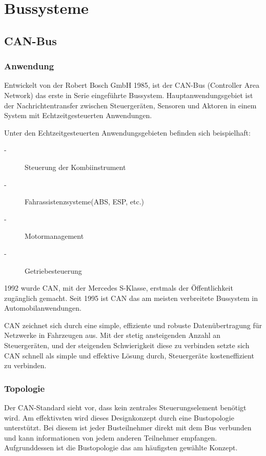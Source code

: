 

\section{Bussysteme}

\subsection{CAN-Bus}
    \subsubsection{Anwendung}
    Entwickelt von der Robert Bosch GmbH 1985, ist der CAN-Bus (Controller Area Network) 
    das erste in Serie eingeführte Bussystem. Hauptanwendungsgebiet ist der
    Nachrichtentransfer zwischen Steuergeräten, Sensoren und Aktoren in 
    einem System mit Echtzeitgesteuerten Anwendungen.~\cite{LA_CAN1}

    Unter den Echtzeitgesteuerten Anwendungsgebieten befinden sich beispielhaft:
    \begin{description}
    \item[-] Steuerung der Kombiinstrument
    \item[-] Fahrassistenzsysteme(ABS, ESP, etc.)
    \item[-] Motormanagement
    \item[-] Getriebesteuerung
    \end{description}
    1992 wurde CAN, mit der Mercedes S-Klasse, erstmals der Öffentlichkeit zugänglich gemacht. 
    Seit 1995 ist CAN das am meisten verbreitete Bussystem in Automobilanwendungen.
 
    CAN zeichnet sich durch eine simple, effiziente und robuste Datenübertragung für Netzwerke in 
    Fahrzeugen aus. Mit der stetig ansteigenden Anzahl an Steuergeräten, und der steigenden 
    Schwierigkeit diese zu verbinden setzte sich CAN schnell als simple und effektive 
    Lösung durch, Steuergeräte kosteneffizient zu verbinden.~\cite{LA_CAN2}

    \subsubsection{Topologie}
    Der CAN-Standard sieht vor, dass kein zentrales Steuerungselement benötigt wird.
    Am effektivsten wird dieses Designkonzept durch eine Bustopologie unterstützt. Bei diesem
    ist jeder Busteilnehmer direkt mit dem Bus verbunden und kann informationen von jedem anderen
    Teilnehmer empfangen. Aufgrunddessen ist die Bustopologie das am häufigsten gewählte Konzept.
    ~\cite{LA_Bosch_6te_auflage}
    
